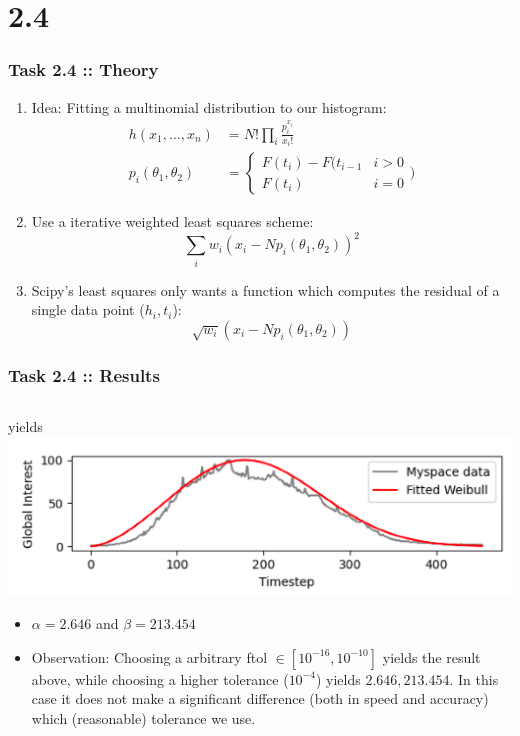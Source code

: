 \documentclass[10pt,aspectratio=169,handout]{beamer}
\begin{document}
\section{2.4}
\begin{frame}
    \frametitle{Task 2.4 :: Theory}

    \begin{enumerate}
        \item Idea: Fitting a multinomial distribution to our histogram:
        \begin{align*}
            h(x_1,\dots,x_n)&=N!\prod_{i}\frac{p_i^{x_i}}{x_i!}\\
            p_i(\theta_1,\theta_2)&=\begin{cases}
                F(t_i)-F(t_{i-1} & i>0\\
                F(t_i) & i=0 
            \end{cases})
        \end{align*}
        \item Use a iterative weighted least squares scheme:\[\sum_i w_i (x_i-Np_i(\theta_1,\theta_2))^2\]
        \item Scipy's least squares only wants a function which computes the residual of a single data point ($h_i, t_i$): \[\sqrt{w_i}(x_i-Np_i(\theta_1,\theta_2))\]  
    \end{enumerate}

\end{frame}

\begin{frame}
    \frametitle{Task 2.4 :: Results}
    \vspace{-5mm}
    \inputminted[bgcolor=LightGray,fontsize=\small]{python}{code/weibull_histrogram.py}
    yields 
    \vspace{-5mm}
    \includegraphics[width=\textwidth]{images/Fitted_Weibull_T4.png}
    \vspace{-5mm}
    \begin{itemize}
        \item $\alpha=2.646$  and $\beta=213.454$
        \item Observation: Choosing a arbitrary ftol $\in [10^{-16},10^{-10}]$ yields the result above, while choosing a higher tolerance ($10^{-4}$) yields $2.646, 213.454$. In this case 
        it does not make a significant difference (both in speed and accuracy) which (reasonable) tolerance we use.
    \end{itemize}

\end{frame}
\end{document}
